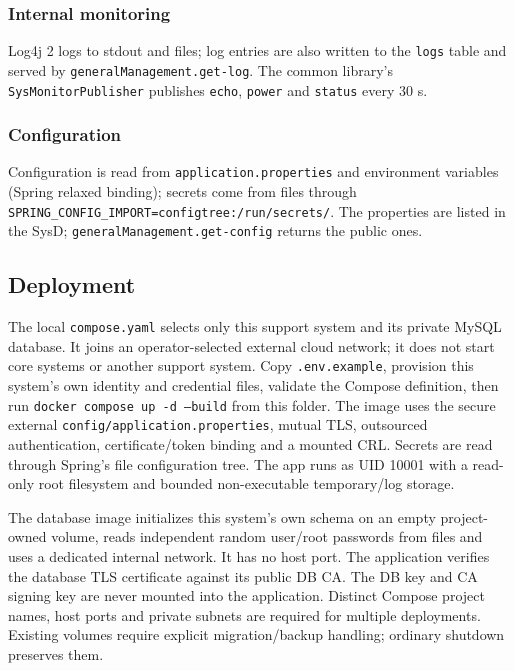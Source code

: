 \documentclass[a4paper]{arrowhead}
\begin{document}
\subsubsection{Internal monitoring}

Log4j 2 logs to stdout and files; log entries are also written to the \texttt{logs} table and served by \texttt{general\allowbreak{}Management.\allowbreak{}get-\allowbreak{}log}. The common library's \texttt{Sys\allowbreak{}Monitor\allowbreak{}Publisher} publishes \texttt{echo}, \texttt{power} and \texttt{status} every 30 s.

\subsubsection{Configuration}

Configuration is read from \texttt{application.\allowbreak{}properties} and environment variables (Spring relaxed binding); secrets come from files through \texttt{SPRING\_\allowbreak{}CONFIG\_\allowbreak{}IMPORT=\allowbreak{}configtree:\allowbreak{}/\allowbreak{}run/\allowbreak{}secrets/\allowbreak{}}. The properties are listed in the SysD; \texttt{general\allowbreak{}Management.\allowbreak{}get-\allowbreak{}config} returns the public ones.

\subsection{Deployment}

The local \texttt{compose.yaml} selects only this support system and its private MySQL database. It joins an operator-selected external cloud network; it does not start core systems or another support system. Copy \texttt{.env.example}, provision this system's own identity and credential files, validate the Compose definition, then run \texttt{docker compose up -d --build} from this folder. The image uses the secure external \texttt{config/application.properties}, mutual TLS, outsourced authentication, certificate/token binding and a mounted CRL. Secrets are read through Spring's file configuration tree. The app runs as UID 10001 with a read-only root filesystem and bounded non-executable temporary/log storage.

The database image initializes this system's own schema on an empty project-owned volume, reads independent random user/root passwords from files and uses a dedicated internal network. It has no host port. The application verifies the database TLS certificate against its public DB CA. The DB key and CA signing key are never mounted into the application. Distinct Compose project names, host ports and private subnets are required for multiple deployments. Existing volumes require explicit migration/backup handling; ordinary shutdown preserves them.
\end{document}
